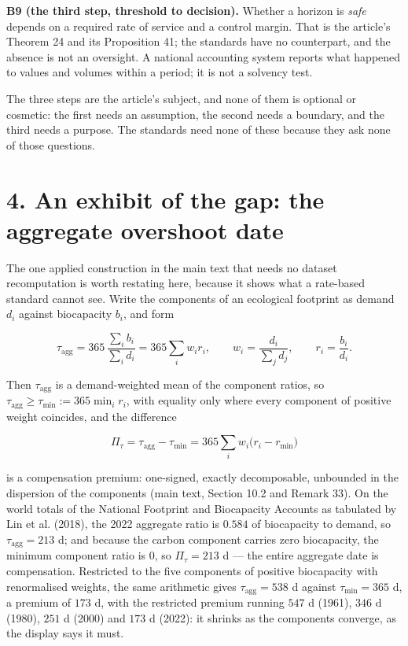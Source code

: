 \documentclass[11pt]{article}
\begin{document}
\textbf{B9 (the third step, threshold to decision).} Whether a horizon is \emph{safe} depends on a required rate of service and a control margin. That is the article's Theorem 24 and its Proposition 41; the standards have no counterpart, and the absence is not an oversight. A national accounting system reports what happened to values and volumes within a period; it is not a solvency test.

The three steps are the article's subject, and none of them is optional or cosmetic: the first needs an assumption, the second needs a boundary, and the third needs a purpose. The standards need none of these because they ask none of those questions.

\vspace{0.8em}

\section*{4. An exhibit of the gap: the aggregate overshoot date}\label{4-an-exhibit-of-the-gap-the-aggregate-overshoot-date}

The one applied construction in the main text that needs no dataset recomputation is worth restating here, because it shows what a rate-based standard cannot see. Write the components of an ecological footprint as demand \(d_i\) against biocapacity \(b_i\), and form

\[ \tau_{\mathrm{agg}}=365\,\frac{\sum_i b_i}{\sum_i d_i}=365\sum_i w_i r_i,\qquad w_i=\frac{d_i}{\sum_j d_j}, \qquad r_i=\frac{b_i}{d_i}. \]

Then \(\tau_{\mathrm{agg}}\) is a demand-weighted mean of the component ratios, so \(\tau_{\mathrm{agg}}\ge\tau_{\min}:=365\min_i r_i\), with equality only where every component of positive weight coincides, and the difference

\[ \Pi_\tau=\tau_{\mathrm{agg}}-\tau_{\min}=365\sum_i w_i\bigl(r_i-r_{\min}\bigr) \]

is a compensation premium: one-signed, exactly decomposable, unbounded in the dispersion of the components (main text, Section 10.2 and Remark 33). On the world totals of the National Footprint and Biocapacity Accounts as tabulated by Lin et al. (2018), the 2022 aggregate ratio is \(0.584\) of biocapacity to demand, so \(\tau_{\mathrm{agg}} = 213\) d; and because the carbon component carries zero biocapacity, the minimum component ratio is \(0\), so \(\Pi_\tau = 213\) d --- the entire aggregate date is compensation. Restricted to the five components of positive biocapacity with renormalised weights, the same arithmetic gives \(\tau_{\mathrm{agg}} = 538\) d against \(\tau_{\min} = 365\) d, a premium of \(173\) d, with the restricted premium running \(547\) d (1961), \(346\) d (1980), \(251\) d (2000) and \(173\) d (2022): it shrinks as the components converge, as the display says it must.
\end{document}

